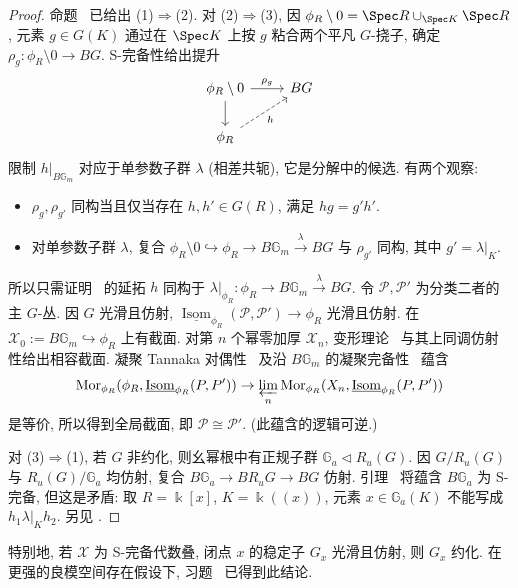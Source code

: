 \begin{proof}
命题~ 已给出 (1)$\Rightarrow$(2). 对 (2)$\Rightarrow$(3), 因 $\phi_R\setminus0=\Spec R\cup_{\Spec K}\Spec R$, 元素 $g\in G(K)$ 通过在 $\Spec K$ 上按 $g$ 粘合两个平凡 $G$-挠子, 确定 $\rho_g:\phi_R\setminus0\to BG$. S-完备性给出提升
\begin{align}\label{src:7.10.31}
\begin{tikzcd}[ampersand replacement=\&]\phi_R\setminus0\arrow[r,"{\rho_g}"]\arrow[d]\&BG\\\phi_R\arrow[ur,dashed,"{h}"']\&\end{tikzcd}
\end{align}
限制 $h|_{B\mathbb G_m}$ 对应于单参数子群 $\lambda$ (相差共轭), 它是分解中的候选. 有两个观察:
\begin{itemize}
\item $\rho_g,\rho_{g'}$ 同构当且仅当存在 $h,h'\in G(R)$, 满足 $hg=g'h'$.
\item 对单参数子群 $\lambda$, 复合 $\phi_R\setminus0\hookrightarrow\phi_R\to B\mathbb G_m\xrightarrow{\lambda}BG$ 与 $\rho_{g'}$ 同构, 其中 $g'=\lambda|_K$.
\end{itemize}
所以只需证明~ 的延拓 $h$ 同构于 $\lambda|_{\phi_R}:\phi_R\to B\mathbb G_m\xrightarrow{\lambda}BG$. 令 $\mathcal P,\mathcal P'$ 为分类二者的主 $G$-丛. 因 $G$ 光滑且仿射, $\underline{\operatorname{Isom}}_{\phi_R}(\mathcal P,\mathcal P')\to\phi_R$ 光滑且仿射. 在 $\mathcal X_0:=B\mathbb G_m\hookrightarrow\phi_R$ 上有截面. 对第 $n$ 个幂零加厚 $\mathcal X_n$, 变形理论~ 与其上同调仿射性给出相容截面. 凝聚 Tannaka 对偶性~ 及沿 $B\mathbb G_m$ 的凝聚完备性~ 蕴含
\[\operatorname{Mor}_{\phi_R}(\phi_R,\underline{\operatorname{Isom}}_{\phi_R}(\mathcal P,\mathcal P'))\to\varprojlim_n\operatorname{Mor}_{\phi_R}(\mathcal X_n,\underline{\operatorname{Isom}}_{\phi_R}(\mathcal P,\mathcal P'))\]
是等价, 所以得到全局截面, 即 $\mathcal P\cong\mathcal P'$. (此蕴含的逻辑可逆.)

对 (3)$\Rightarrow$(1), 若 $G$ 非约化, 则幺幂根中有正规子群 $\mathbb G_a\triangleleft R_u(G)$. 因 $G/R_u(G)$ 与 $R_u(G)/\mathbb G_a$ 均仿射, 复合 $B\mathbb G_a\to BR_uG\to BG$ 仿射. 引理~ 将蕴含 $B\mathbb G_a$ 为 S-完备, 但这是矛盾: 取 $R=\Bbbk[x]$, $K=\Bbbk((x))$, 元素 $x\in\mathbb G_a(K)$ 不能写成 $h_1\lambda|_Kh_2$. 另见 \cite[定理~A]{AHHL21}.
\end{proof}
特别地, 若 $\mathcal X$ 为 S-完备代数叠, 闭点 $x$ 的稳定子 $G_x$ 光滑且仿射, 则 $G_x$ 约化. 在更强的良模空间存在假设下, 习题~ 已得到此结论.

